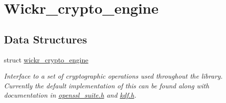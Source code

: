 \hypertarget{group__wickr__crypto__engine}{}\section{Wickr\+\_\+crypto\+\_\+engine}
\label{group__wickr__crypto__engine}
\subsection*{Data Structures}
\begin{DoxyCompactItemize}
\item 
struct \mbox{\hyperlink{structwickr__crypto__engine}{wickr\+\_\+crypto\+\_\+engine}}
\begin{DoxyCompactList}\small\item\em Interface to a set of cryptographic operations used throughout the library. Currently the default implementation of this can be found along with documentation in \mbox{\hyperlink{openssl__suite_8h_source}{openssl\+\_\+suite.\+h}} and \mbox{\hyperlink{kdf_8h_source}{kdf.\+h}}. \end{DoxyCompactList}\end{DoxyCompactItemize}
